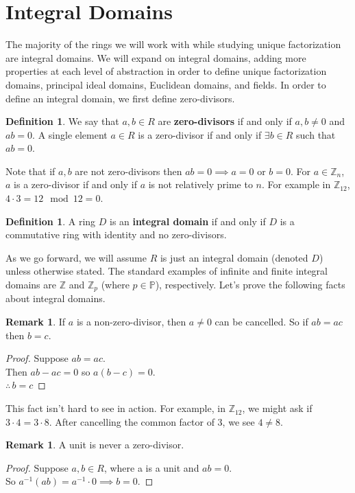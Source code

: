 \documentclass[11pt]{amsart}
\theoremstyle{definition}
\newtheorem{definition}[theorem]{Definition}
\newtheorem{remark}[theorem]{Remark}
\newcommand{\integers}{\mathbb{Z}}
\newcommand{\primes}{\mathbb{P}}
\begin{document}
\section{Integral Domains}
The majority of the rings we will work with while studying unique factorization are integral domains. We will expand on integral domains, adding
more properties at each level of abstraction in order to define unique factorization domains, principal ideal domains, Euclidean domains, and
fields. In order to define an integral domain, we first define zero-divisors.
\begin{definition}
	We say that $a, b \in R$ are \textbf{zero-divisors} if and only if $a, b \neq 0$ and $ab = 0$. A single element $a \in R$ is a zero-divisor
	if and only if $\exists b \in R$ such that $ab = 0$.
\end{definition}
Note that if $a, b$ are not zero-divisors then $ab = 0 \implies a = 0$ or $b = 0$. For $a \in \integers_{n}$, $a$ is a zero-divisor if and only if $a$
is not relatively prime to $n$. For example in $\integers_{12}$, $4 \cdot 3 = 12 \mod 12 = 0$.
\begin{definition}
	A ring $D$ is an \textbf{integral domain} if and only if $D$ is a commutative ring with identity and no zero-divisors.
\end{definition}
As we go forward, we will assume $R$ is just an integral domain (denoted $D$) unless otherwise stated. The standard examples of infinite and
finite integral domains are $\integers$ and $\integers_{p}$ (where $p \in \primes$), respectively. Let's prove the following facts about integral
domains.
\begin{remark}
	If $a$ is a non-zero-divisor, then $a \neq 0$ can be cancelled. So if $ab = ac$ then $b = c$.
\end{remark}
\begin{proof}
	Suppose $ab = ac$. \\
	Then $ab - ac = 0$ so $a(b - c) = 0$. \\
	$\therefore \, b = c$
\end{proof}
This fact isn't hard to see in action. For example, in $\integers_{12}$, we might ask if $3 \cdot 4 = 3 \cdot 8$. After cancelling the common factor
of 3, we see $4 \neq 8$.
\begin{remark}
	A unit is never a zero-divisor.
\end{remark}
\begin{proof}
	Suppose $a, b \in R$, where a is a unit and $ab = 0$. \\
	So $a^{-1}(ab) = a^{-1} \cdot 0 \implies b = 0$.
\end{proof}
\newpage
\end{document}
